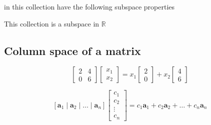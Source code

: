 \documentclass[main.tex]{subfiles}
\begin{document}
    in this collection have the following subspace properties 

    This collection is a subspace in $\mathbb{R}$

\subsection{Column space of a matrix} 

    $$
    \left[\begin{array}{ll}
    2 & 4 \\
    0 & 6
    \end{array}\right]\left[\begin{array}{l}
    x_{1} \\
    x_{2}
    \end{array}\right]=x_{1}\left[\begin{array}{l}
    2 \\
    0
    \end{array}\right]+x_{2}\left[\begin{array}{l}
    4 \\
    6
    \end{array}\right]
    $$
    
    $$
    \left[\bm{a}_{1} \mid \bm{a}_{2} \mid \ldots \mid \bm{a}_{n}\right]
    \left[\begin{array}{c}
    c_{1} \\
    c_{2} \\
    \vdots \\
    c_{n}
    \end{array}\right] = c_{1} \bm{a}_{1} + c_{2}\bm{a}_2 + \ldots + c_{n} \bm{a}_n
    $$
    
\end{document}
